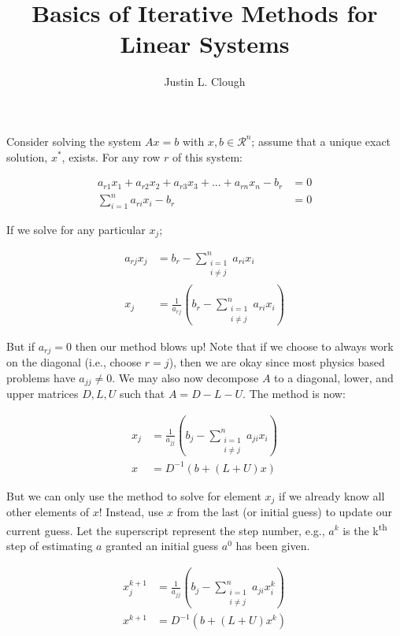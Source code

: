 \documentclass[a4paper, 12pt]{article}
\author{Justin L. Clough}
\title{Basics of Iterative Methods for Linear Systems}
\begin{document}
\maketitle

Consider solving the system $Ax=b$ with $x,b \in \mathcal{R}^n$; 
assume that a unique exact solution, $x^*$, exists.
For any row $r$ of this system:

\begin{align}
a_{r1}x_1 + a_{r2}x_2 + a_{r3}x_3 +  ... +  a_{rn}x_n - b_r &= 0 \\
\sum_{i=1}^n a_{ri}x_i - b_r &= 0
\end{align}

\noindent
If we solve for any particular $x_j$;

\begin{align}
a_{rj}x_j &= b_r - \sum_{\substack{ i=1 \\ i \neq j}}^n a_{ri}x_i \\
x_j &= \frac{1}{a_{rj}} \left(b_r - \sum_{\substack{ i=1 \\ i \neq j}}^n a_{ri}x_i \right)
\end{align}

\noindent
But if $a_{rj} = 0$ then our method blows up!
Note that if we choose to always work on the diagonal (i.e., choose $r=j$), 
then we are okay since most physics based problems have $a_{jj} \neq 0$.
We may also now decompose $A$ to a diagonal, lower, and upper matrices $D,L,U$ such that
$A=D-L-U$.
The method is now:

\begin{align}
x_j &= \frac{1}{a_{jj}} \left(b_j - \sum_{\substack{ i=1 \\ i \neq j}}^n a_{ji}x_i \right) \\
x &= D^{-1} (b + (L+U)x) 
\end{align}

\noindent
But we can only use the method to solve for element $x_j$
if we already know all other elements of $x$!
Instead, use $x$ from the last (or initial guess) to update our current guess.
Let the superscript represent the step number, e.g., $a^k$ 
is the k\textsuperscript{th} step of estimating $a$ granted an 
initial guess $a^0$ has been given.

\begin{align}
x^{k+1}_j &= \frac{1}{a_{jj}} \left(b_j - \sum_{\substack{ i=1 \\ i \neq j}}^n a_{ji}x^k_i \right) \\
x^{k+1} &= D^{-1} (b + (L+U)x^k) 
\end{align}
\end{document}
